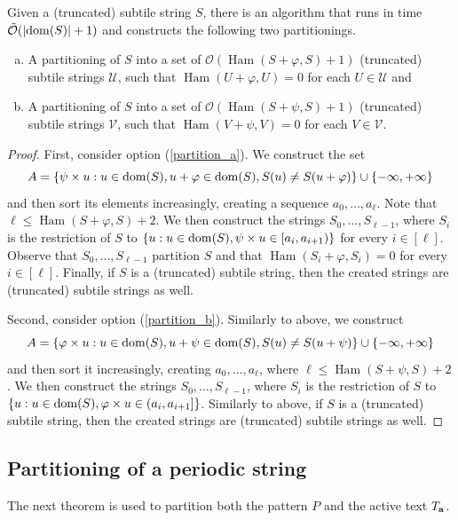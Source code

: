 \documentclass[twoside,leqno]{article}
\renewcommand{\O}{\mathcal{O}}
\newcommand{\tO}{\tilde{\mathcal{O}}}
\newcommand{\U}{\mathcal{U}}
\newcommand{\V}{\mathcal{V}}
\renewcommand{\phi}{\varphi}
\newcommand{\set}[1]{\left\lbrace #1 \right\rbrace}
\DeclareMathOperator*{\Ham}{Ham}
\newcommand{\absolute}[1]{\left\lvert#1\right\rvert}
\begin{document}
\begin{lemma}\label{cut_partitioning}
Given a (truncated) subtile string $S$, there is an algorithm that runs in time $\tO(\absolute{\d{S}} + 1)$ and constructs the following two partitionings.
	\begin{enumerate}[(a)]
		\item A partitioning of $S$ into a set of $\O(\Ham(S + \phi, S) + 1)$ (truncated) subtile strings $\U$, such that $\Ham(U + \phi, U) = 0$ for each $U \in \U$ and \label{partition_a}
		\item A partitioning of $S$ into a set of $\O(\Ham(S + \psi, S) + 1)$ (truncated) subtile strings $\V$, such that $\Ham(V + \psi, V) = 0$ for each $V \in \V$. \label{partition_b}
	\end{enumerate}
	\begin{proof}
		First, consider option (\ref{partition_a}). We construct the set
		\[ A = \set{\s{u} : u \in \d{S}, u + \phi \in \d{S}, S(u) \neq S(u + \phi)} \cup \set{-\infty, +\infty}\]
		and then sort its elements increasingly, creating a sequence $a_0, \dots, a_\ell$.
		Note that $\ell \le \Ham(S + \phi, S) + 2$.
		We then construct the strings $S_0, \dots, S_{\ell - 1}$, where $S_i$ is the restriction of $S$ to
		$\set{u : u \in \d{S}, \s{u} \in [a_i, a_{i + 1})}$ for every $i \in [\ell]$.
		Observe that $S_0, \dots, S_{\ell - 1}$ partition $S$ and that $\Ham(S_i + \phi, S_i) = 0$ for every $i \in [\ell]$. Finally, if $S$ is a (truncated) subtile string, then the created strings are (truncated) subtile strings as well.
	
		Second, consider option (\ref{partition_b}). Similarly to above, we construct
		\[ A = \set{\h{u} : u \in \d{S}, u + \psi \in \d{S}, S(u) \neq S(u + \psi)} \cup \set{-\infty, +\infty} \]
		and then sort it increasingly, creating $a_0, \dots, a_\ell$, where $\ell \le \Ham(S + \psi, S) + 2$.
		We then construct the strings $S_0, \dots, S_{\ell - 1}$, where $S_i$ is the restriction of $S$ to 
		$\set{u : u \in \d{S}, \h{u} \in (a_i, a_{i + 1}]}$. Similarly to above, if $S$ is a (truncated) subtile string, then the created strings are (truncated) subtile strings as well.
	\end{proof}
\end{lemma}


\subsection{Partitioning of a periodic string}
The next theorem is used to partition both the pattern $P$ and the active text $T_\mathbf{a}$.
\end{document}
